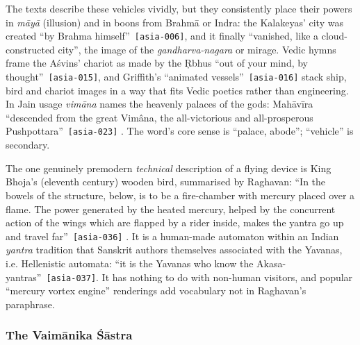 \documentclass[11pt,a4paper]{article}
\newcommand{\pid}[1]{\texttt{\small #1}}
\begin{document}
The texts describe these vehicles vividly, but they consistently place their powers in \emph{māyā} (illusion) and in boons from Brahmā or Indra: the Kalakeyas' city was created \enquote{by Brahma himself}~\pid{[asia-006]}, and it finally ``vanished, like a cloud-constructed city'', the image of the \emph{gandharva-nagara} or mirage. Vedic hymns frame the Aśvins' chariot as made by the Ṛbhus \enquote{out of your mind, by thought}~\pid{[asia-015]}, and Griffith's \enquote{animated vessels}~\pid{[asia-016]} stack ship, bird and chariot images in a way that fits Vedic poetics rather than engineering. In Jain usage \emph{vimāna} names the heavenly palaces of the gods: Mahāvīra \enquote{descended from the great Vimâna, the all-victorious and all-prosperous Pushpottara}~\pid{[asia-023]} \parencite{jacobi1884jaina}. The word's core sense is ``palace, abode''; ``vehicle'' is secondary.

The one genuinely premodern \emph{technical} description of a flying device is King Bhoja's (eleventh century) wooden bird, summarised by Raghavan: \enquote{In the bowels of the structure, below, is to be a fire-chamber with mercury placed over a flame. The power generated by the heated mercury, helped by the concurrent action of the wings which are flapped by a rider inside, makes the yantra go up and travel far}~\pid{[asia-036]} \parencite{raghavan1952yantras}. It is a human-made automaton within an Indian \emph{yantra} tradition that Sanskrit authors themselves associated with the Yavanas, i.e. Hellenistic automata: \enquote{it is the Yavanas who know the Akasa-yantras}~\pid{[asia-037]}. It has nothing to do with non-human visitors, and popular ``mercury vortex engine'' renderings add vocabulary not in Raghavan's paraphrase.

\subsubsection{The Vaimānika Śāstra}
\end{document}
